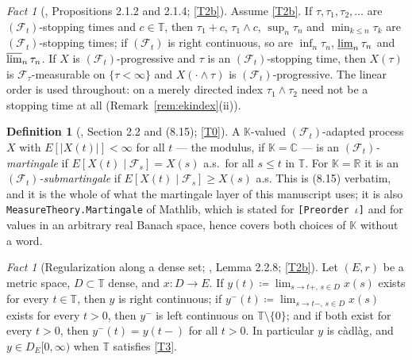 \documentclass[11pt,a4paper]{article}
\theoremstyle{plain}
\theoremstyle{definition}
\newtheorem{definition}[theorem]{Definition}
\theoremstyle{remark}
\newtheorem{fact}[theorem]{Fact}
\newcommand{\R}{\mathbb{R}}
\newcommand{\T}{\mathbb{T}}                     %
\newcommand{\DE}{D_E[0,\infty)}
\newcommand{\Filt}{\mathcal{F}}
\newcommand{\K}{\mathbb{K}}
\newcommand{\C}{\mathbb{C}}
\newcommand{\EK}{\cite{EK86}}
\begin{document}
\begin{fact}[\EK, Propositions 2.1.2 and 2.1.4; \eqref{T2b}]
  \label{fact:stoppingtimes}
  Assume \eqref{T2b}.  If $\tau, \tau_1, \tau_2, \dots$ are $(\Filt_t)$-stopping
  times and $c \in \T$, then $\tau_1 + c$, $\tau_1 \wedge c$, $\sup_n \tau_n$ and
  $\min_{k \leq n} \tau_k$ are $(\Filt_t)$-stopping times; if $(\Filt_t)$ is
  right continuous, so are $\inf_n \tau_n$, $\varliminf_n \tau_n$ and
  $\varlimsup_n \tau_n$.  If $X$ is $(\Filt_t)$-progressive and $\tau$ is an
  $(\Filt_t)$-stopping time, then $X(\tau)$ is $\Filt_\tau$-measurable on
  $\{\tau < \infty\}$ and $X(\cdot \wedge \tau)$ is $(\Filt_t)$-progressive.
  The linear order is used throughout: on a merely directed index
  $\tau_1 \wedge \tau_2$ need not be a stopping time at all
  (Remark~\ref{rem:ekindex}(ii)).
\end{fact}

\begin{definition}[\EK, Section 2.2 and (8.15); \eqref{T0}]
  \label{def:martingale}
  A $\K$-valued $(\Filt_t)$-adapted process $X$ with $E[|X(t)|] < \infty$ for all
  $t$ --- the modulus, if $\K = \C$ --- is an \emph{$(\Filt_t)$-martingale} if
  $E[X(t) \mid \Filt_s] = X(s)$ a.s.\ for all $s \leq t$ in $\T$.  For $\K = \R$
  it is an \emph{$(\Filt_t)$-submartingale} if $E[X(t) \mid \Filt_s] \geq X(s)$
  a.s.  This is \EK{} (8.15) verbatim, and it is the whole of what the martingale
  layer of this manuscript uses; it is also
  \texttt{MeasureTheory.Martingale} of Mathlib, which is stated for
  \texttt{[Preorder \(\iota\)]} and for values in an arbitrary real Banach space,
  hence covers both choices of $\K$ without a word.
\end{definition}

\begin{fact}[Regularization along a dense set; \EK, Lemma 2.2.8; \eqref{T2b}]
  \label{fact:cadlagext}
  Let $(E,r)$ be a metric space, $D \subset \T$ dense, and
  $x : D \to E$.  If
  $y(t) \coloneqq \lim_{s \to t+,\, s \in D} x(s)$ exists for every $t \in \T$,
  then $y$ is right continuous; if
  $y^-(t) \coloneqq \lim_{s \to t-,\, s \in D} x(s)$ exists for every $t > 0$,
  then $y^-$ is left continuous on $\T \setminus \{0\}$; and if both exist for
  every $t>0$, then $y^-(t) = y(t-)$ for all $t > 0$.  In particular $y$ is
  c\`adl\`ag, and $y \in \DE$ when $\T$ satisfies \eqref{T3}.
\end{fact}
\end{document}
